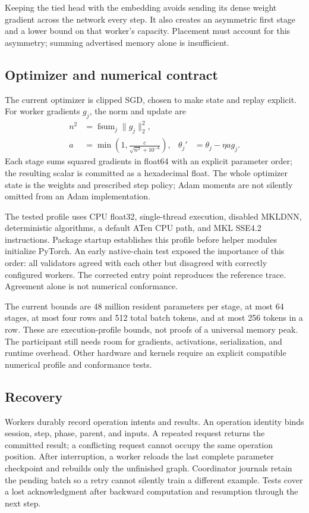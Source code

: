 \documentclass[11pt]{article}
\begin{document}
Keeping the tied head with the embedding avoids sending its dense weight gradient across the network every step. It also creates an asymmetric first stage and a lower bound on that worker's capacity. Placement must account for this asymmetry; summing advertised memory alone is insufficient.

\subsection{Optimizer and numerical contract}
The current optimizer is clipped SGD, chosen to make state and replay explicit. For worker gradients $g_j$, the norm and update are
\begin{align}
 n^2&=\operatorname{fsum}_j\|g_j\|_2^2,\\
 a&=\min\left(1,\frac{c}{\sqrt{n^2}+10^{-6}}\right), &
 \theta_j'&=\theta_j-\eta a g_j.
\end{align}
Each stage sums squared gradients in float64 with an explicit parameter order; the resulting scalar is committed as a hexadecimal float. The whole optimizer state is the weights and prescribed step policy; Adam moments are not silently omitted from an Adam implementation.

The tested profile uses CPU float32, single-thread execution, disabled MKLDNN, deterministic algorithms, a default ATen CPU path, and MKL SSE4.2 instructions. Package startup establishes this profile before helper modules initialize PyTorch. An early native-chain test exposed the importance of this order: all validators agreed with each other but disagreed with correctly configured workers. The corrected entry point reproduces the reference trace. Agreement alone is not numerical conformance.

The current bounds are 48 million resident parameters per stage, at most 64 stages, at most four rows and 512 total batch tokens, and at most 256 tokens in a row. These are execution-profile bounds, not proofs of a universal memory peak. The participant still needs room for gradients, activations, serialization, and runtime overhead. Other hardware and kernels require an explicit compatible numerical profile and conformance tests.

\subsection{Recovery}
Workers durably record operation intents and results. An operation identity binds session, step, phase, parent, and inputs. A repeated request returns the committed result; a conflicting request cannot occupy the same operation position. After interruption, a worker reloads the last complete parameter checkpoint and rebuilds only the unfinished graph. Coordinator journals retain the pending batch so a retry cannot silently train a different example. Tests cover a lost acknowledgment after backward computation and resumption through the next step.
\end{document}
